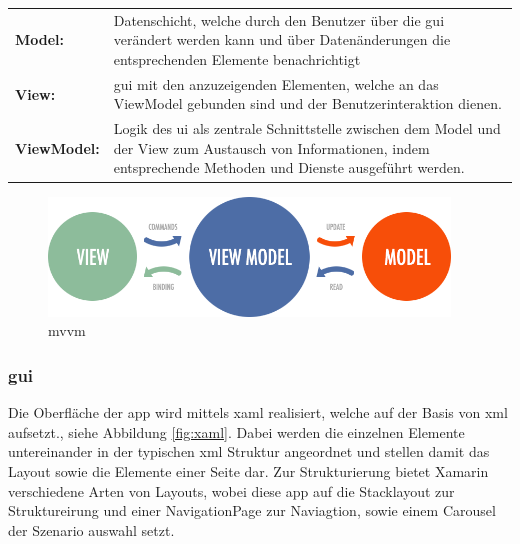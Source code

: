 \begin{tabular}{p{2.5cm} p{12.25cm}}
	\textbf{Model:} & Datenschicht, welche durch den Benutzer über die \gls{gui} verändert werden kann und über Datenänderungen die entsprechenden Elemente benachrichtigt \\
	\textbf{View:} & \gls{gui} mit den anzuzeigenden Elementen, welche an das ViewModel gebunden sind und der Benutzerinteraktion dienen. \\
	\textbf{ViewModel:} & Logik des \gls{ui} als zentrale Schnittstelle zwischen dem Model und der View zum Austausch von Informationen, indem entsprechende Methoden und Dienste ausgeführt werden. \\
\end{tabular}

\bigskip

\begin{figure}[h]
	\begin{center}
		\includegraphics[width=0.95\textwidth]{images/implementation/mvvm.png}
	\end{center}	
	\caption{\acrlong{mvvm} \cite{Brecht.MVVMEntity}}
	\label{fig:mvvm}
\end{figure}

\newpage
\subsubsection{\acrfull{gui}} %

Die Oberfläche der \gls{app} wird mittels \gls{xaml} realisiert, welche auf der Basis von \gls{xml} aufsetzt., siehe Abbildung \ref{fig:xaml}. Dabei werden die einzelnen Elemente untereinander in der typischen \gls{xml} Struktur angeordnet und stellen damit das Layout sowie die Elemente einer Seite dar. Zur Strukturierung bietet Xamarin verschiedene Arten von Layouts, wobei diese \gls{app} auf die Stacklayout zur Struktureirung und einer NavigationPage zur Naviagtion, sowie einem Carousel der Szenario auswahl setzt.


